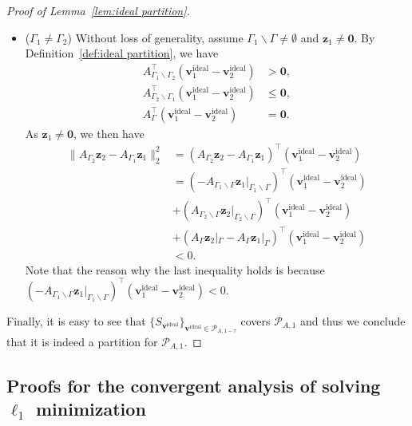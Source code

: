 \documentclass[11pt]{article}
\theoremstyle{remark}
\theoremstyle{definition}
\newcommand{\bz}{\mathbf{z}}
\newcommand{\bv}{\mathbf{v}}
\begin{document}
\begin{proof}[Proof of Lemma~\ref{lem:ideal partition}]
\begin{itemize}
		\item ($\Gamma_1\neq\Gamma_2$) Without loss of generality, assume $\Gamma_1\backslash\Gamma\neq\emptyset$ and $\bz_1\neq\mathbf{0}$. By Definition~\ref{def:ideal partition}, we have
		\begin{align*}
		A_{\Gamma_1\backslash\Gamma_2}^\top\left(\bv^\text{ideal}_1-\bv^\text{ideal}_2\right)&>\mathbf{0},\\
		A_{\Gamma_2\backslash\Gamma_1}^\top\left(\bv^\text{ideal}_1-\bv^\text{ideal}_2\right)&\leq\mathbf{0},\\
		A_{\Gamma}^\top\left(\bv^\text{ideal}_1-\bv^\text{ideal}_2\right)&=\mathbf{0}.
		\end{align*}
		As $\bz_1\neq\mathbf{0}$, we then have
		\begin{align*}
		\|A_{\Gamma_2}\bz_2-A_{\Gamma_1}\bz_1\|_2^2 &= \left(A_{\Gamma_2}\bz_2-A_{\Gamma_1}\bz_1\right)^\top\left(\bv^\text{ideal}_1-\bv^\text{ideal}_2\right)\\
		&=\left(-A_{\Gamma_1\backslash\Gamma}\bz_1|_{\Gamma_1\backslash\Gamma}\right)^\top\left(\bv^\text{ideal}_1-\bv^\text{ideal}_2\right)\\
		&+\left(A_{\Gamma_2\backslash\Gamma}\bz_2|_{\Gamma_2\backslash\Gamma}\right)^\top\left(\bv^\text{ideal}_1-\bv^\text{ideal}_2\right)\\
		&+\left(A_{\Gamma}\bz_2|_{\Gamma}-A_{\Gamma}\bz_1|_{\Gamma}\right)^\top\left(\bv^\text{ideal}_1-\bv^\text{ideal}_2\right)\\
		&<0.
		\end{align*}
		Note that the reason why the last inequality holds is because $\left(-A_{\Gamma_1\backslash\Gamma}\bz_1|_{\Gamma_1\backslash\Gamma}\right)^\top\left(\bv^\text{ideal}_1-\bv^\text{ideal}_2\right)<0$.
	\end{itemize}
	Finally, it is easy to see that $\{S_{\bv^\text{ideal}}\}_{\bv^\text{ideal}\in\mathcal{P}_{A,1-\tau}}$ covers $\mathcal{P}_{A,1}$ and thus we conclude that it is indeed a partition for $\mathcal{P}_{A,1}$.
\end{proof}

\subsection{Proofs for the convergent analysis of solving $\ell_1$ minimization}\label{sec:missing proofs convergent analysis l1}
\end{document}
